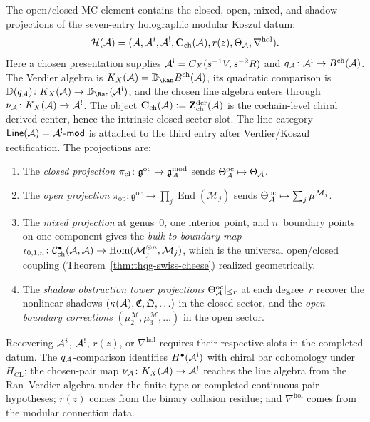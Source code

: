 \begin{theorem}
\label{thm:thqg-oc-projection}
The open/closed MC element contains the closed, open, mixed, and
shadow projections of the seven-entry holographic modular Koszul
datum:
\[
\mathcal{H}(\mathcal{A})
=
(\mathcal{A},\mathcal{A}^i,\mathcal{A}^!,\mathbf{C}_{\mathrm{ch}}(\mathcal{A}),
r(z),\Theta_{\mathcal{A}},
\nabla^{\mathrm{hol}}).
\]
Here a chosen presentation supplies
$\mathcal{A}^{\mathrm i}=C_X(s^{-1}V,s^{-2}R)$ and
$q_{\mathcal{A}}\colon\mathcal{A}^{\mathrm i}\to B^{\mathrm{ch}}(\mathcal{A})$.
The Verdier algebra is
$K_X(\cA)=\mathbb D_{\Ran}B^{\mathrm{ch}}(\cA)$, its quadratic
comparison is
$\mathbb D(q_\cA)\colon K_X(\cA)\to
\mathbb D_{\Ran}(\cA^{\mathrm i})$, and the chosen line algebra enters
through $\nu_{\mathcal{A}}\colon K_X(\mathcal{A})\to\mathcal{A}^!$.  The object
$\mathbf{C}_{\mathrm{ch}}(\mathcal{A})
:=\mathbf{Z}^{\mathrm{der}}_{\mathrm{ch}}(\mathcal{A})$ is the
cochain-level chiral derived center, hence the intrinsic
closed-sector slot. The
line category
$\mathsf{Line}(\mathcal{A})=\mathcal{A}^!\text{-}\mathsf{mod}$ is attached to
the third entry after Verdier/Koszul rectification. The projections
are:
\begin{enumerate}[label=\textup{(\roman*)}]
\item The \emph{closed projection}
 $\pi_{\mathrm{cl}} \colon
 \mathfrak{g}^{\mathrm{oc}} \to \mathfrak{g}_{\mathcal{A}}^{\mathrm{mod}}$
 sends $\Theta^{\mathrm{oc}}_{\mathcal{A}} \mapsto \Theta_{\mathcal{A}}$.

\item The \emph{open projection}
 $\pi_{\mathrm{op}} \colon
 \mathfrak{g}^{\mathrm{oc}} \to
 \prod_j \operatorname{End}(\mathcal{M}_j)$
 sends $\Theta^{\mathrm{oc}}_{\mathcal{A}} \mapsto
 \sum_j \mu^{\mathcal{M}_j}$.

\item The \emph{mixed projection} at genus~$0$, one interior
 point, and $n$~boundary points on one component gives the
 \emph{bulk-to-boundary map}
 $\iota_{0,1,n} \colon
 \mathcal{C}^{\bullet}_{\mathrm{ch}}(\mathcal{A}, \mathcal{A}) \to
 \operatorname{Hom}(\mathcal{M}_j^{\otimes n}, \mathcal{M}_j)$,
 which is the universal open/closed coupling
 (Theorem~\ref{thm:thqg-swiss-cheese}) realized geometrically.

\item The \emph{shadow obstruction tower projections}
 $\Theta^{\mathrm{oc}}_{\mathcal{A}}|_{\le r}$ at each degree~$r$ recover
 the nonlinear shadows
 $(\kappa(\mathcal{A}), \mathfrak{C}, \mathfrak{Q}, \ldots)$
 in the closed sector, and the \emph{open boundary corrections}
 $(\mu_2^{\mathcal{M}}, \mu_3^{\mathcal{M}}, \ldots)$
 in the open sector.
\end{enumerate}
Recovering $\mathcal{A}^i$, $\mathcal{A}^!$, $r(z)$, or
$\nabla^{\mathrm{hol}}$ requires their respective slots in the
completed datum. The
$q_{\mathcal{A}}$-comparison identifies
$H^\bullet(\mathcal{A}^{\mathrm i})$ with chiral bar cohomology under
$H_{\mathrm{CL}}$; the chosen-pair map
$\nu_{\mathcal{A}}\colon K_X(\mathcal{A})\to\mathcal{A}^!$ reaches the line algebra from the
Ran--Verdier algebra under the finite-type or completed continuous
pair hypotheses; $r(z)$ comes from the
binary collision residue; and $\nabla^{\mathrm{hol}}$ comes from the
modular connection data.
\end{theorem}

